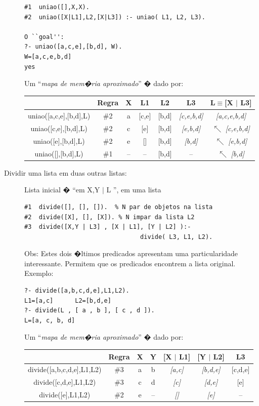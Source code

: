 \documentclass[final,a4paper]{article}
\begin{document}
\begin{description}
\begin{verbatim}
#1  uniao([],X,X).
#2  uniao([X|L1],L2,[X|L3]) :- uniao( L1, L2, L3).

O ``goal'':
?- uniao([a,c,e],[b,d], W).
W=[a,c,e,b,d]
yes
\end{verbatim}
Um ``{\em mapa de mem�ria aproximado}'' � dado por:

{\small
\begin{center}
\begin{tabular}
[c]{|c|c|c|c|c|c|c|}\hline
& Regra & X & L1 & L2 & L3 & L$\equiv$[X $\vert$ L3] \\ \hline
uniao([a,c,e],[b,d],L) & \#2 & a & [c,e] & [b,d] & \emph{[c,e,b,d]} & \emph{[a,c,e,b,d]}  \\\hline
uniao([c,e],[b,d],L) & \#2 & c & [e] & [b,d] & \emph{[e,b,d]} & $\nwarrow$  \emph{[c,e,b,d]} \\\hline
uniao([e],[b,d],L) & \#2 & e & [] & [b,d] & \emph{[b,d]} & $\nwarrow$  \emph{[e,b,d]} \\\hline
uniao([],[b,d],L) & \#1 & -- & -- & [b,d] & -- & $\nwarrow$  \emph{[b,d]} \\\hline
\end{tabular}%
\end{center}
}

\newpage
\item [Dividir uma lista em   duas  outras listas:]  Lista inicial � ``{em \lbrack  X,Y $\vert $ L \rbrack }'', em uma lista

\begin{verbatim}
#1  divide([], [], []).  % N par de objetos na lista
#2  divide([X], [], [X]). % N impar da lista L2
#3  divide([X,Y | L3] , [X | L1], [Y | L2] ):-
                                divide( L3, L1, L2).
\end{verbatim}

Obs: Estes dois �ltimos predicados apresentam
uma particularidade interessante. Permitem que os predicados encontrem a lista
original. Exemplo:
\begin{verbatim}
?- divide([a,b,c,d,e],L1,L2).
L1=[a,c]      L2=[b,d,e]
?- divide(L , [ a , b ], [ c , d ]).
L=[a, c, b, d]
\end{verbatim}
Um ``{\em mapa de mem�ria aproximado}'' � dado por:
{\small
\begin{center}
\begin{tabular}
[c]{|c|c|c|c|c|c|c|}\hline & Regra & X & Y & [X $\vert$ L1] & [Y
$\vert$ L2] & L3\\\hline divide([a,b,c,d,e],L1,L2) & \#3 & a & b &
\emph{[a,c]} & \emph{[b,d,e]} & [c,d,e]\\\hline
divide([c,d,e],L1,L2) & \#3 & c & d & \emph{[c]} & \emph{[d,e]} &
[e]\\\hline divide([e],L1,L2) & \#2 & e & -- & \emph{[]} &
\emph{[e]} & --\\\hline
\end{tabular}
\end{center}
}


\end{description}
\end{document}
